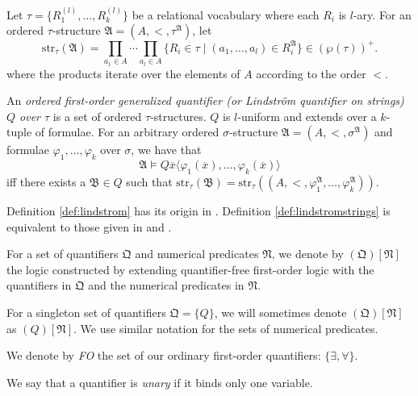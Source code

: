 \documentclass[a4paper,UKenglish,cleveref, autoref, thm-restate, anonymous]{lipics-v2021}
\begin{document}
\begin{definition}\label{def:lindstromstrings}
    Let $\tau = \{R_1^{(l)}, \dots, R_k^{(l)}\}$ be a relational vocabulary where each $R_i$ is $l$-ary. For an ordered $\tau$-structure $\mathfrak{A} = (A, <, \tau^\mathfrak{A})$, let \[
        \text{str}_\tau(\mathfrak{A}) = \prod_{a_1 \in A}\cdots\prod_{a_l \in A}\{ R_i \in \tau \mid (a_1, \dots, a_l) \in R_i^\mathfrak{A} \} \in (\wp(\tau))^{+}.
    \] where the products iterate over the elements of $A$ according to the order $<$.

    An \emph{ordered first-order generalized quantifier (or Lindstr{\"o}m quantifier on strings) $Q$ over $\tau$} is a set of ordered $\tau$-structures. $Q$ is $l$-uniform and extends over a $k$-tuple of formulae. For an arbitrary ordered $\sigma$-structure $\mathfrak{A} = (A, <, \sigma^{\mathfrak{A}})$ and formulae $\varphi_1, \dots, \varphi_k$ over $\sigma$, we have that \[
        \mathfrak{A} \models Q\overline{x}\langle \varphi_1(\overline{x}), \dots, \varphi_k(\overline{x})\rangle
    \] iff there exists a $\mathfrak{B} \in Q$ such that \(
        \text{str}_\tau(\mathfrak{B}) = \text{str}_\tau((A, <, \varphi_1^\mathfrak{A}, \dots, \varphi_k^\mathfrak{A})).
    \)
\end{definition}
\begin{remark}
    Definition \ref{def:lindstrom} has its origin in \cite{lindstrom1966first}. Definition \ref{def:lindstromstrings} is equivalent to those given in \cite{burtschick1998lindstrom} and \cite{lautemann2001descriptive}. 
\end{remark}
\fi

\begin{definition}
    For a set of quantifiers $\mathfrak{Q}$ and numerical predicates $\mathfrak{N}$, we denote by $(\mathfrak{Q})[\mathfrak{N}]$ the logic constructed by extending quantifier-free first-order logic with the quantifiers in $\mathfrak{Q}$ and the numerical predicates in $\mathfrak{N}$. 

    For a singleton set of quantifiers $\mathfrak{Q} = \{Q\}$, we will sometimes denote $(\mathfrak{Q})[\mathfrak{N}]$ as $(Q)[\mathfrak{N}]$. We use similar notation for the sets of numerical predicates.

    We denote by \emph{FO} the set of our ordinary first-order quantifiers: $\{\exists, \forall\}$.
\end{definition}

\begin{definition}
    We say that a quantifier is \emph{unary} if it binds only one variable.
\end{definition}
\end{document}
